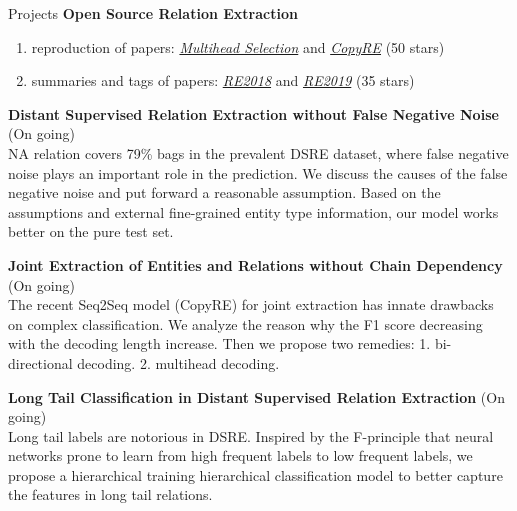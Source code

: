 \documentclass{resume} %
\begin{document}
\begin{rSection}{Projects}
{\bf Open Source Relation Extraction}
\begin{enumerate}
    \item reproduction of papers: \href{https://github.com/WindChimeRan/pytorch_multi_head_selection_re}{\textit{Multihead Selection}} and \href{https://github.com/WindChimeRan/pytorch_copy_re}{\textit{CopyRE}} (50 stars)
    \item summaries and tags of papers: \href{https://github.com/WindChimeRan/NREPapers2018}{\textit{RE2018}} and \href{https://github.com/WindChimeRan/NREPapers2019}{\textit{RE2019}} (35 stars)
\end{enumerate}

{\bf Distant Supervised Relation Extraction without False Negative Noise} (On going)\\
    NA relation covers 79\% bags in the prevalent DSRE dataset, where false negative noise plays an important role in the prediction. We discuss the causes of the false negative noise and put forward a reasonable assumption. Based on the assumptions and external fine-grained entity type information, our model works better on the pure test set.

{\bf Joint Extraction of Entities and Relations without Chain Dependency} (On going)\\
    The recent Seq2Seq model (CopyRE) for joint extraction has innate drawbacks on complex classification. We analyze the reason why the F1 score decreasing with the decoding length increase. Then we propose two remedies: 1. bi-directional decoding. 2. multihead decoding.

{\bf Long Tail Classification in Distant Supervised Relation Extraction} (On going)\\
    Long tail labels are notorious in DSRE. Inspired by the F-principle that neural networks prone to learn from high frequent labels to low frequent labels, we propose a hierarchical training hierarchical classification model to better capture the features in long tail relations.
    

\end{rSection}
\end{document}
